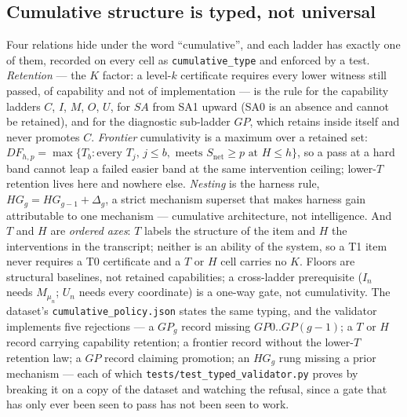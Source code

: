 \documentclass[11pt]{article}
\theoremstyle{definition}
\begin{document}
\subsection{Cumulative structure is typed, not universal}\label{sec:typed}
Four relations hide under the word ``cumulative'', and each ladder has exactly one of them, recorded on every cell as \texttt{cumulative\_type} and enforced by a test. \emph{Retention} --- the $K$ factor: a level-$k$ certificate requires every lower witness still passed, of capability and not of implementation --- is the rule for the capability ladders $C$, $I$, $M$, $O$, $U$, for $SA$ from SA1 upward (SA0 is an absence and cannot be retained), and for the diagnostic sub-ladder $GP$, which retains inside itself and never promotes $C$. \emph{Frontier} cumulativity is a maximum over a retained set: $DF_{h,p} = \max\{T_b : \text{every } T_j,\, j \le b, \text{ meets } S_{\mathrm{net}} \ge p \text{ at } H \le h\}$, so a pass at a hard band cannot leap a failed easier band at the same intervention ceiling; lower-$T$ retention lives here and nowhere else. \emph{Nesting} is the harness rule, $HG_g = HG_{g-1} + \Delta_g$, a strict mechanism superset that makes harness gain attributable to one mechanism --- cumulative architecture, not intelligence. And $T$ and $H$ are \emph{ordered axes}: $T$ labels the structure of the item and $H$ the interventions in the transcript; neither is an ability of the system, so a T1 item never requires a T0 certificate and a $T$ or $H$ cell carries no $K$. Floors are structural baselines, not retained capabilities; a cross-ladder prerequisite ($I_n$ needs $M_{\mu_n}$; $U_n$ needs every coordinate) is a one-way gate, not cumulativity. The dataset's \texttt{cumulative\_policy.json} states the same typing, and the validator implements five rejections --- a $GP_g$ record missing $GP0..GP(g{-}1)$; a $T$ or $H$ record carrying capability retention; a frontier record without the lower-$T$ retention law; a $GP$ record claiming promotion; an $HG_g$ rung missing a prior mechanism --- each of which \texttt{tests/test\_typed\_validator.py} proves by breaking it on a copy of the dataset and watching the refusal, since a gate that has only ever been seen to pass has not been seen to work.
\end{document}
